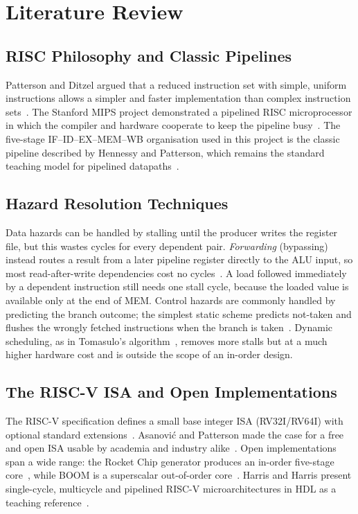\section{Literature Review}

\subsection{RISC Philosophy and Classic Pipelines}
Patterson and Ditzel argued that a reduced instruction set with simple, uniform
instructions allows a simpler and faster implementation than complex instruction
sets~\cite{patterson1980risc}. The Stanford MIPS project demonstrated a pipelined
RISC microprocessor in which the compiler and hardware cooperate to keep the pipeline
busy~\cite{hennessy1982mips}. The five-stage IF--ID--EX--MEM--WB organisation used in
this project is the classic pipeline described by Hennessy and Patterson, which remains
the standard teaching model for pipelined datapaths~\cite{hennessyQA,pattersonRV}.

\subsection{Hazard Resolution Techniques}
Data hazards can be handled by stalling until the producer writes the register file,
but this wastes cycles for every dependent pair. \emph{Forwarding} (bypassing) instead
routes a result from a later pipeline register directly to the ALU input, so most
read-after-write dependencies cost no cycles~\cite{pattersonRV}. A load followed
immediately by a dependent instruction still needs one stall cycle, because the loaded
value is available only at the end of MEM. Control hazards are commonly handled by
predicting the branch outcome; the simplest static scheme predicts not-taken and
flushes the wrongly fetched instructions when the branch is taken~\cite{hennessyQA}.
Dynamic scheduling, as in Tomasulo's algorithm~\cite{tomasulo1967}, removes more stalls
but at a much higher hardware cost and is outside the scope of an in-order design.

\subsection{The RISC-V ISA and Open Implementations}
The RISC-V specification defines a small base integer ISA (RV32I/RV64I) with optional
standard extensions~\cite{rvmanual,waterman2011}. Asanovi\'c and Patterson made the case
for a free and open ISA usable by academia and industry alike~\cite{asanovic2014free}.
Open implementations span a wide range: the Rocket Chip generator produces an in-order
five-stage core~\cite{rocket2016}, while BOOM is a superscalar out-of-order
core~\cite{boom2015}. Harris and Harris present single-cycle, multicycle and pipelined
RISC-V microarchitectures in HDL as a teaching reference~\cite{harrisRV}.

